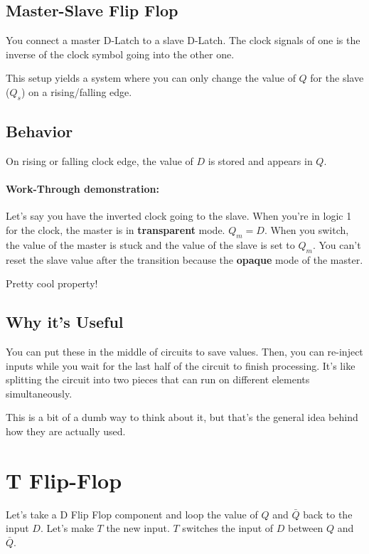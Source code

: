 \documentclass[a4paper,12pt]{report}
\begin{document}
\subsection{Master-Slave Flip Flop}
You connect a master D-Latch to a slave D-Latch. The clock signals of one is the inverse 
of the clock symbol going into the other one. 

This setup yields a system where you can only change the value of $Q$ for the slave ($Q_s$) 
on a rising/falling edge. 

\subsection{Behavior} On rising or falling clock edge, the value of $D$ is stored and 
appears in $Q$.

\paragraph{Work-Through demonstration: } Let's say you have the inverted clock going 
to the slave. When you're in logic 1 for the clock, the master is in \textbf{transparent} 
mode. $Q_m = D$. When you switch, the value of the master is stuck and the value of the 
slave is set to $Q_m$. You can't reset the slave value after the transition because the 
\textbf{opaque} mode of the master. 

Pretty cool property! 

\subsection{Why it's Useful}

You can put these in the middle of circuits to save values. Then, you can re-inject inputs 
while you wait for the last half of the circuit to finish processing. It's like splitting 
the circuit into two pieces that can run on different elements simultaneously. 

This is a bit of a dumb way to think about it, but that's the general idea behind how 
they are actually used. 


\section{T Flip-Flop}
Let's take a D Flip Flop component and loop the value of $Q$ and $\bar{Q}$ back to the 
input $D$. Let's make $T$ the new input. $T$ switches the input of $D$ between $Q$ and 
$\bar{Q}$. 

\end{document}
